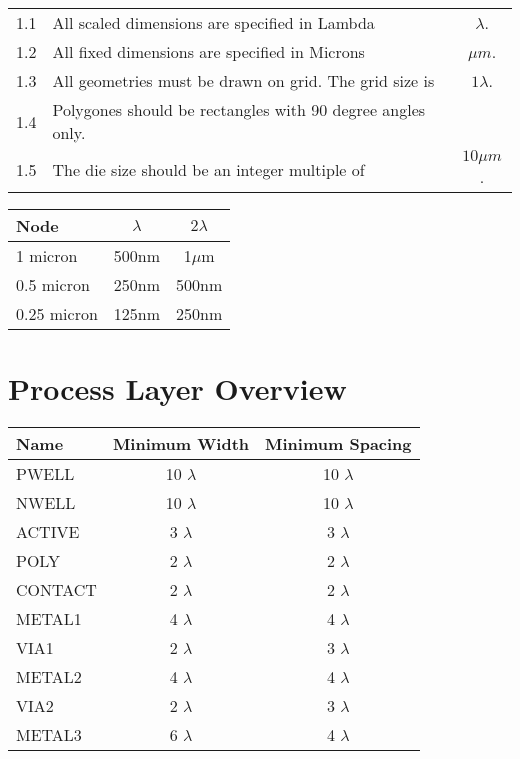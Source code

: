 \documentclass[10pt,a4paper,oneside]{article}
\newcounter{ct}
\begin{document}
\begin{flushleft}
    \begin{tabular}{c p{9cm} c}
        1.1  & All scaled dimensions are specified in Lambda & $\lambda$. \\
        1.2  & All fixed dimensions are specified in Microns & $\mu m$. \\
        1.3  & All geometries must be drawn on grid. The grid size is & $1 \lambda$. \\
        1.4  & Polygones should be rectangles with 90 degree angles only. \\
        1.5  & The die size should be an integer multiple of & $10 \mu m$. \\
    \end{tabular}
\end{flushleft}


\begin{center}
    \begin{tabular}{|l|c|c|}
    \hline
        \textbf{Node} & \textbf{$\lambda$} & \textbf{$2 \lambda$} \\
    \hline
	    1 micron & 500nm & 1$\mu$m \\
	    0.5 micron & 250nm & 500nm \\
	    0.25 micron & 125nm & 250nm \\
    \hline
    \end{tabular}
\end{center}

\section{Process Layer Overview}\label{design_rules_process_layer_overview}

\begin{center}
    \begin{tabular}{|l|c|c|}
    \hline
        \textbf{Name} & \textbf{Minimum Width} & \textbf{Minimum Spacing} \\
    \hline
        PWELL   & 10 $\lambda$ & 10 $\lambda$ \\
        NWELL   & 10 $\lambda$ & 10 $\lambda$ \\
        ACTIVE  & 3  $\lambda$ & 3  $\lambda$ \\
        POLY    & 2  $\lambda$ & 2  $\lambda$ \\
        CONTACT & 2  $\lambda$ & 2  $\lambda$ \\
        METAL1  & 4  $\lambda$ & 4  $\lambda$ \\
        VIA1    & 2  $\lambda$ & 3  $\lambda$ \\
        METAL2  & 4  $\lambda$ & 4  $\lambda$ \\
        VIA2    & 2  $\lambda$ & 3  $\lambda$ \\
        METAL3  & 6  $\lambda$ & 4  $\lambda$ \\
    \hline
    \end{tabular}
\end{center}
\end{document}
